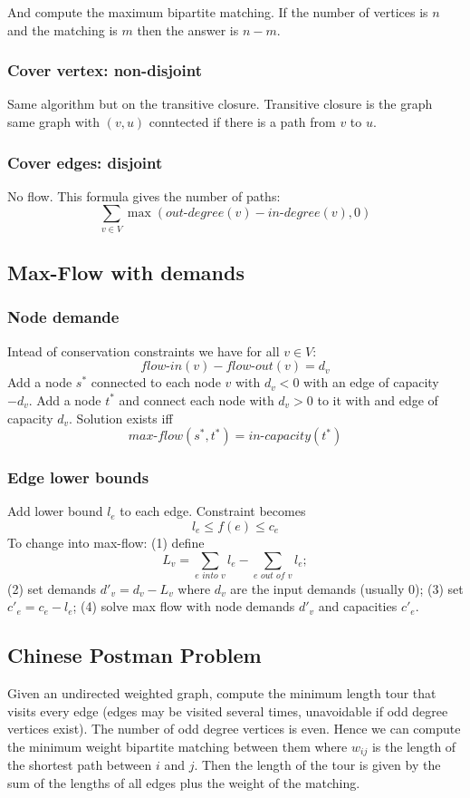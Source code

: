 And compute the maximum bipartite matching. If the number of vertices is $n$ and the matching is
$m$ then the answer is $n - m$.

\subsubsection{Cover vertex: non-disjoint}

Same algorithm but on the transitive closure. Transitive closure is the graph
same graph with $(v, u)$ conntected if there is a path from $v$ to $u$.

\subsubsection{Cover edges: disjoint}

No flow. This formula gives the number of paths:
$$
\sum_{v \in V} \max \left( \textit{out-degree}(v) - \textit{in-degree}(v), 0 \right)
$$

\subsection{Max-Flow with demands}

\subsubsection{Node demande}

Intead of conservation constraints we have for all $v \in V$:
$$
\textit{flow-in}(v) - \textit{flow-out}(v) = d_v 
$$
Add a node $s^*$ connected to each node $v$ with $d_v < 0$ with an
edge of capacity $-d_v$. Add a node $t^*$ and connect each node with
$d_v > 0$ to it with and edge of capacity $d_v$. Solution exists iff
$$
\textit{max-flow}(s^*, t^*) = \textit{in-capacity}(t^*)
$$

\subsubsection{Edge lower bounds}

Add lower bound $l_e$ to each edge. Constraint becomes
$$
l_e \leq f(e) \leq c_e
$$
To change into max-flow: (1) define
$$
L_v = \sum_{e \textit{ into } v} l_e - \sum_{e \textit{ out of } v} l_e;
$$
(2) set demands $d'_v = d_v - L_v$ where $d_v$ are the input demands (usually $0$);
(3) set $c'_e = c_e - l_e$; (4) solve max flow with node demands $d'_v$ and 
capacities $c'_e$.


\subsection{Chinese Postman Problem}

Given an undirected weighted graph, compute the minimum length tour that visits every edge (edges may be visited several times, unavoidable if odd degree vertices exist). The number of odd degree vertices is even. Hence we can compute the minimum weight bipartite matching between them where $w_{ij}$ is the length of the shortest path between $i$ and $j$. Then the length of the tour is given by the sum of the lengths of all edges plus the weight of the matching.

